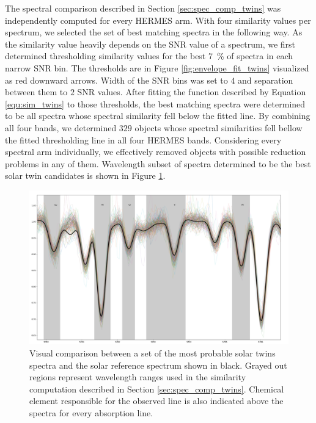 The spectral comparison described in Section \ref{sec:spec_comp_twins} was independently computed for every HERMES arm. With four similarity values per spectrum, we selected the set of best matching spectra in the following way. As the similarity value heavily depends on the SNR value of a spectrum, we first determined thresholding similarity values for the best 7~\% of spectra in each narrow SNR bin. The thresholds are in Figure \ref{fig:envelope_fit_twins} visualized as red downward arrows. Width of the SNR bins was set to $4$ and separation between them to $2$ SNR values. After fitting the function described by Equation \ref{equ:sim_twins} to those thresholds, the best matching spectra were determined to be all spectra whose spectral similarity fell below the fitted line. By combining all four bands, we determined $329$ objects whose spectral similarities fell bellow the fitted thresholding line in all four HERMES bands. Considering every spectral arm individually, we effectively removed objects with possible reduction problems in any of them. Wavelength subset of spectra determined to be the best solar twin candidates is shown in Figure \ref{fig:selection_step1_twins}.

\begin{figure}
	\centering
	\includegraphics[width=\textwidth]{selection_step1.png}
	\caption{Visual comparison between a set of the most probable solar twins spectra and the solar reference spectrum shown in black. Grayed out regions represent wavelength ranges used in the similarity computation described in Section \ref{sec:spec_comp_twins}. Chemical element responsible for the observed line is also indicated above the spectra for every absorption line.}
	\label{fig:selection_step1_twins}
\end{figure}

